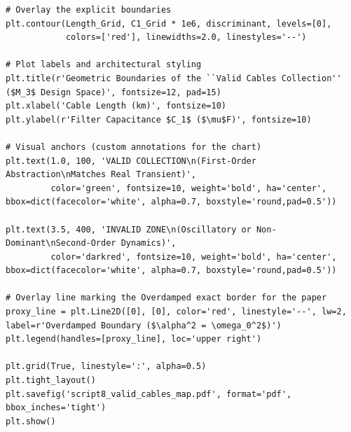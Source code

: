 \documentclass[11pt, a4paper]{article}
\begin{document}
{\begin{verbatim}
# Overlay the explicit boundaries
plt.contour(Length_Grid, C1_Grid * 1e6, discriminant, levels=[0],
            colors=['red'], linewidths=2.0, linestyles='--')

# Plot labels and architectural styling
plt.title(r'Geometric Boundaries of the ``Valid Cables Collection'' ($M_3$ Design Space)', fontsize=12, pad=15)
plt.xlabel('Cable Length (km)', fontsize=10)
plt.ylabel(r'Filter Capacitance $C_1$ ($\mu$F)', fontsize=10)

# Visual anchors (custom annotations for the chart)
plt.text(1.0, 100, 'VALID COLLECTION\n(First-Order Abstraction\nMatches Real Transient)',
         color='green', fontsize=10, weight='bold', ha='center', bbox=dict(facecolor='white', alpha=0.7, boxstyle='round,pad=0.5'))

plt.text(3.5, 400, 'INVALID ZONE\n(Oscillatory or Non-Dominant\nSecond-Order Dynamics)',
         color='darkred', fontsize=10, weight='bold', ha='center', bbox=dict(facecolor='white', alpha=0.7, boxstyle='round,pad=0.5'))

# Overlay line marking the Overdamped exact border for the paper
proxy_line = plt.Line2D([0], [0], color='red', linestyle='--', lw=2, label=r'Overdamped Boundary ($\alpha^2 = \omega_0^2$)')
plt.legend(handles=[proxy_line], loc='upper right')

plt.grid(True, linestyle=':', alpha=0.5)
plt.tight_layout()
plt.savefig('script8_valid_cables_map.pdf', format='pdf', bbox_inches='tight')
plt.show()
\end{verbatim}
}


\end{document}
